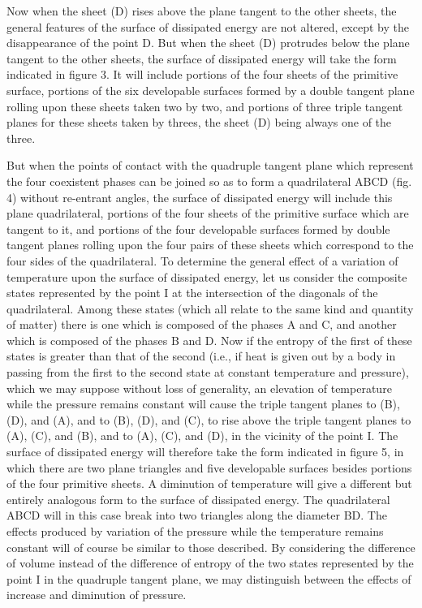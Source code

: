 \documentclass[11pt]{article}
\begin{document}
Now when the sheet (D) rises above the plane tangent to the other sheets, the general features of the surface of dissipated energy are not altered, except by the disappearance of the point D. But when the sheet (D) protrudes below the plane tangent to the other sheets, the surface of dissipated energy will take the form indicated in figure 3. It will include portions of the four sheets of the primitive surface, portions of the six developable surfaces formed by a double tangent plane rolling upon these sheets taken two by two, and portions of three triple tangent planes for these sheets taken by threes, the sheet (D) being always one of the three.

But when the points of contact with the quadruple tangent plane which represent the four coexistent phases can be joined so as to form a quadrilateral ABCD (fig. 4) without re-entrant angles, the surface of dissipated energy will include this plane quadrilateral, portions of the four sheets of the primitive surface which are tangent to it, and portions of the four developable surfaces formed by double tangent planes rolling upon the four pairs of these sheets which correspond to the four sides of the quadrilateral. To determine the general effect of a variation of temperature upon the surface of dissipated energy, let us consider the composite states represented by the point I at the intersection of the diagonals of the quadrilateral. Among these states (which all relate to the same kind and quantity of matter) there is one which is composed of the phases A and C, and another which is composed of the phases B and D. Now if the entropy of the first of these states is greater than that of the second (i.e., if heat is given out by a body in passing from the first to the second state at constant temperature and pressure), which we may suppose without loss of generality, an elevation of temperature while the pressure remains constant will cause the triple tangent planes to (B), (D), and (A), and to (B), (D), and (C), to rise above the triple tangent planes to (A), (C), and (B), and to (A), (C), and (D), in the vicinity of the point I. The surface of dissipated energy will therefore take the form indicated in figure 5, in which there are two plane triangles and five developable surfaces besides portions of the four primitive sheets. A diminution of temperature will give a different but entirely analogous form to the surface of dissipated energy. The quadrilateral ABCD will in this case break into two triangles along the diameter BD. The effects produced by variation of the pressure while the temperature remains constant will of course be similar to those described. By considering the difference of volume instead of the difference of entropy of the two states represented by the point I in the quadruple tangent plane, we may distinguish between the effects of increase and diminution of pressure.
\end{document}

